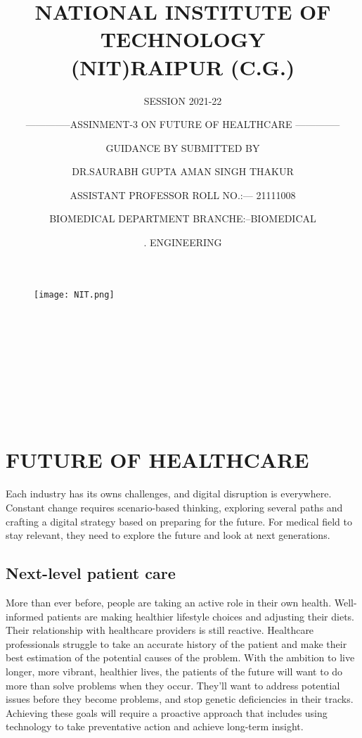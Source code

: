 \documentclass[12pt]{article}
\title{NATIONAL INSTITUTE OF TECHNOLOGY\\
(NIT)RAIPUR (C.G.)}
\author {SESSION 2021-22}
\date{}
\begin{document}
\maketitle
\begin{figure}[h]
\centering
\texttt{[image: NIT.png]}
\end{figure}
\author {--------------ASSINMENT-3 ON {FUTURE OF HEALTHCARE} --------------}\\


\author{GUIDANCE BY \> \>\> \>\> \>\>\> \>\> \>\>\>\>\>\>  \>\> \>\>\> \>\> \>\> \> \>\> \>\> \>\> \>\>  SUBMITTED BY }\\


\author{DR.SAURABH GUPTA\>  \>\> \>\> \>  \>\> \>\>\>\>\>  \>\> \>\>\>  \>\> \>\> \>  \>\> AMAN SINGH THAKUR }\\

\author{ ASSISTANT PROFESSOR\>  \>\> \>  \> \>   \>\> \>\> \> \>\> \> \>\> \>  ROLL NO.:--- 21111008 }\\
\author{BIOMEDICAL DEPARTMENT\>  \>\> \>\> \>  \>\> \>\> \>\>   \>\> BRANCHE:--BIOMEDICAL  }\\
\author{.\>   \>\> \>\> \>  \>\> \>\> \>\> \>\> \>\> \>  \>\> \>\> \>\>\>\> \>\> \>\>  \>\> \>\> \>\> \>\>\> \>\> \>   \>\> \>\> \>\> \>\>\> \>\> \>    \>\> \>\> \>\> \>\> \>\> \>  \>\> \>\> \>\>  \>\> ENGINEERING }
\clearpage
\tableofcontents
\clearpage

\section{FUTURE OF HEALTHCARE}
Each industry has its owns challenges, and digital disruption is everywhere.
Constant change requires scenario-based thinking, exploring several paths and crafting a digital strategy based on preparing for the future.
For medical field to stay relevant, they need to explore the future and look at next generations.\\




\subsection{Next-level patient care}
More than ever before, people are taking an active role in their own health.
Well-informed patients are making healthier lifestyle choices and adjusting their diets.
Their relationship with healthcare providers is still reactive.
Healthcare professionals struggle to take an accurate history of the patient and make their best estimation of the potential causes of the problem.
With the ambition to live longer, more vibrant, healthier lives, the patients of the future will want to do more than solve problems when they occur.
They'll want to address potential issues before they become problems, and stop genetic deficiencies in their tracks.
Achieving these goals will require a proactive approach that includes using technology to take preventative action and achieve long-term insight.\\
\end{document}
